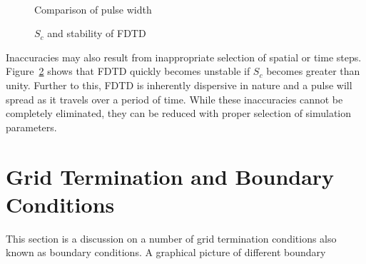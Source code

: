 \begin{figure}[H]
\centering
\mbox{\quad{}}\\
\mbox{\quad{}}
\caption{Comparison of pulse width}
\label{Pulsewidth-comparison}
\end{figure}
\begin{figure}[H]
\centering
\mbox{\quad{}}
\caption{$S_c$ and stability of FDTD}
\label{Unstable-FDTD}
\end{figure}
Inaccuracies may also result from inappropriate selection of spatial or time steps. Figure~\ref{Unstable-FDTD} shows that FDTD quickly becomes unstable if $S_c$ becomes greater than unity. Further to this, FDTD is inherently dispersive in nature and a pulse will spread as it travels over a period of time. While these inaccuracies cannot be completely eliminated, they can be reduced with proper selection of simulation parameters.
\section{Grid Termination and Boundary Conditions}
This section is a discussion on a number of grid termination conditions also known as boundary conditions. A graphical picture of different boundary 